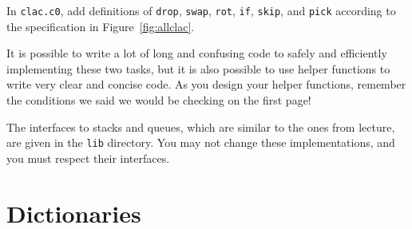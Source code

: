 \documentclass[12pt]{exam}
\begin{document}
\begin{task}[7]
  In \lstinline'clac.c0', add definitions of \lstinline'drop',
  \lstinline'swap', \lstinline'rot',
  \lstinline[language={[clac]C}]'if', \lstinline'skip', and
  \lstinline'pick' according to the specification in
  Figure~\ref{fig:allclac}.
\end{task}

It is possible to write a lot of long and confusing code to safely and
efficiently implementing these two tasks, but it is also possible to
use helper functions to write very clear and concise code. As you
design your helper functions, remember the conditions we said we would
be checking on the first page!

The interfaces to stacks and queues, which are similar to the ones
from lecture, are given in the \lstinline'lib' directory. You may not
change these implementations, and you must respect their interfaces.

\section{Dictionaries}
\end{document}
